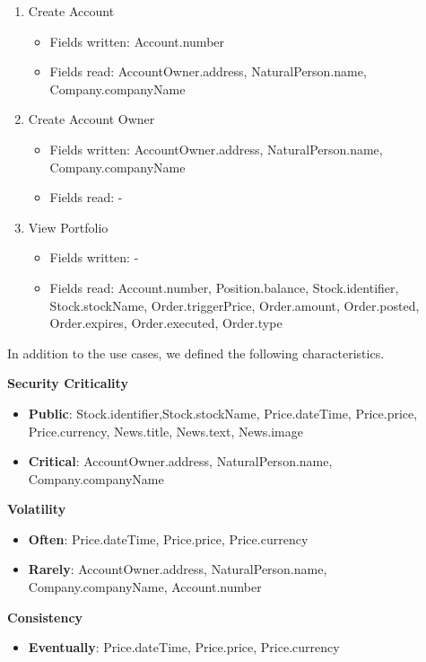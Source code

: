\begin{enumerate}
\begin{itemize}
	\end{itemize}
\item Create Account
	\begin{itemize}
	\item Fields written: Account.number
	\item Fields read: AccountOwner.address, NaturalPerson.name, Company.companyName
	\end{itemize}
\item Create Account Owner
	\begin{itemize}
	\item Fields written: AccountOwner.address, NaturalPerson.name, Company.companyName
	\item Fields read: -
	\end{itemize}
\item View Portfolio
	\begin{itemize}
	\item Fields written: -
	\item Fields read: Account.number, Position.balance, Stock.identifier, Stock.stockName, Order.triggerPrice, Order.amount, Order.posted, Order.expires, Order.executed, Order.type
	\end{itemize}
\end{enumerate}

In addition to the use cases, we defined the following characteristics.

\textbf{Security Criticality}

\begin{itemize}
\item \textbf{Public}: Stock.identifier,Stock.stockName, Price.dateTime, Price.price, Price.currency, News.title, News.text, News.image
\item \textbf{Critical}: AccountOwner.address, NaturalPerson.name, Company.companyName
\end{itemize} 

\textbf{Volatility}

\begin{itemize}
\item \textbf{Often}: Price.dateTime, Price.price, Price.currency
\item \textbf{Rarely}: AccountOwner.address, NaturalPerson.name, Company.companyName, Account.number
\end{itemize}

\textbf{Consistency}

\begin{itemize}
\item \textbf{Eventually}: Price.dateTime, Price.price, Price.currency
\end{itemize}

